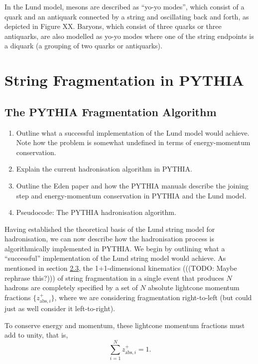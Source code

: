 \documentclass[12pt,a4paper]{report}
\begin{document}
In the Lund model, mesons are described as ``yo-yo modes'', which consist of a quark and an antiquark connected by a string and oscillating back and forth, as depicted in Figure XX. Baryons, which consist of three quarks or three antiquarks, are also modelled as yo-yo modes where one of the string endpoints is a diquark (a grouping of two quarks or antiquarks). 

\chapter{String Fragmentation in PYTHIA}
\label{chap:fragmentation}
\section{The PYTHIA Fragmentation Algorithm}
\begin{enumerate}
\item Outline what a successful implementation of the Lund model would achieve. Note how the problem is somewhat undefined in terms of energy-momentum conservation. 
\item Explain the current hadronisation algorithm in PYTHIA.
\item Outline the Eden paper and how the PYTHIA manuals describe the joining step and energy-momentum conservation in PYTHIA and the Lund model.
\item Pseudocode: The PYTHIA hadronisation algorithm.
  
\end{enumerate}

Having established the theoretical basis of the Lund string model for hadronisation, we can now describe how the hadronisation process is algorithmically implemented in PYTHIA. We begin by outlining what a ``successful'' implementation of the Lund string model would achieve. As mentioned in section \hyperref[sec:lsm]{2.3}, the 1+1-dimensional kinematics (((TODO: Maybe rephrase this?))) of string fragmentation in a single event that produces $N$ hadrons are completely specified by a set of $N$ absolute lightcone momentum fractions $\{ z_{\text{abs},i}^+ \}$, where we are considering fragmentation right-to-left (but could just as well consider it left-to-right).

To conserve energy and momentum, these lightcone momentum fractions must add to unity, that is,
\begin{equation}
  \sum_{i=1}^N z_{\text{abs},i}^+ = 1.
\end{equation}
\end{document}
